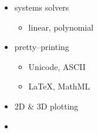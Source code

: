 \documentclass[handout]{beamer}
\begin{document}
\begin{frame}[fragile]
\begin{columns}
\begin{column}[r]{0.5\textwidth}
\begin{itemize}
                \item systems solvers
                    \begin{itemize}
                        \item linear, polynomial
                    \end{itemize}
                \item pretty--printing
                    \begin{itemize}
                        \item Unicode, ASCII
                        \item LaTeX, MathML
                    \end{itemize}
                \item 2D \& 3D plotting
                \item \structure{\ldots}
            \end{itemize}
        \end{column}
    \end{columns}
\end{frame}
\end{document}
